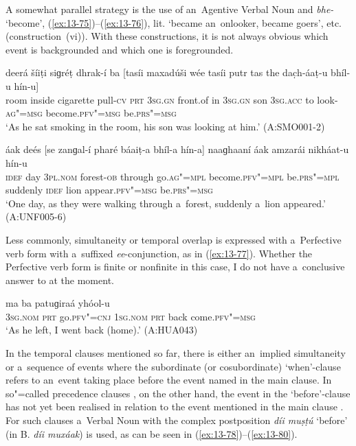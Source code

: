 A somewhat parallel strategy is the use of an~Agentive Verbal Noun and \textit{bhe-} `become', (\ref{ex:13-75})--(\ref{ex:13-76}), lit. `became an~onlooker, became goers', etc. (construction~(vi)). With these constructions, it is not always obvious which event is backgrounded and which one is foregrounded. 

\begin{exe}
\ex
\label{ex:13-75}
\gll deerá šíiṭi siɡréṭ dhrak-í ba [tasíi maxadúši wée tasíi putr tas the dac̣h-áaṭ-u bhíl-u hín-u] \\
room inside cigarette pull-\textsc{cv} \textsc{prt} \textsc{3sg.gn} front.of in \textsc{3sg.gn}  son \textsc{3sg.acc} to look-\textsc{ag"=msg} become.\textsc{pfv"=msg} be.\textsc{prs"=msg}  \\
\glt `As he sat smoking in the room, his son was looking at him.' (A:SMO001-2)

\ex
\label{ex:13-76}
\gll áak deés [se zanɡal-í pharé báaiṭ-a bhíl-a hín-a] naaɡhaaní áak amzarái nikháat-u hín-u \\
\textsc{idef} day \textsc{3pl.nom} forest-\textsc{ob} through go.\textsc{ag"=mpl}  become.\textsc{pfv"=mpl} be.\textsc{prs"=mpl} suddenly \textsc{idef} lion appear.\textsc{pfv"=msg} be.\textsc{prs"=msg}  \\
\glt `One day, as they were walking through a~forest, suddenly a~lion appeared.' (A:UNF005-6) 
\end{exe}

Less commonly, simultaneity or temporal overlap is expressed with a~Perfective verb form with a~suffixed \textit{ee}-conjunction, as in (\ref{ex:13-77}). Whether the Perfective verb form is finite or nonfinite in this case, I do not have a~conclusive answer to at the moment.

\begin{exe}
\ex
\label{ex:13-77}
\gll [so ta ɡúum"=ee] ma ba patuɡiraá yhóol-u \\
\textsc{3sg.nom} \textsc{prt} go.\textsc{pfv"=cnj} \textsc{1sg.nom} \textsc{prt} back  come.\textsc{pfv"=msg} \\
\glt `As he left, I went back (home).' (A:HUA043) 
\end{exe}

 In the temporal clauses mentioned so far, there is either an~implied simultaneity or a~sequence of events where the subordinate (or cosubordinate) `when'-clause refers to an~event taking place before the event named in the main clause. In so"=called precedence clauses \citep[327]{givon2001b}, on the other hand, the event in the `before'-clause has not yet been realised in relation to the event mentioned in the main clause \citep[182]{thompsonlongacre1985}. For such clauses a~Verbal Noun with the complex postposition \textit{díi muṣṭú} `before' (in B. \textit{díi muxáak}) is used, as can be seen in (\ref{ex:13-78})--(\ref{ex:13-80}).

